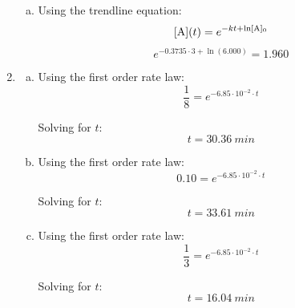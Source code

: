 \documentclass{article}
\begin{document}
\begin{enumerate}[1.]
\begin{enumerate}[a.]
            \item Using the trendline equation:
                $$ [ \ce{ A } ](t) = e^{-kt + \ln [ \ce{ A } ]_{0}} $$
                $$ e^{-0.3735 \cdot 3 + \ln( 6.000 )} = 1.960 $$

        \end{enumerate}
    \item 
        \begin{enumerate}[a.]
            \item Using the first order rate law:
                $$ \frac{ 1 }{ 8 } = e^{-6.85 \cdot 10^{-2} \cdot t} $$

                Solving for $t$:
                $$ t = 30.36\ \si{ min } $$

            \item Using the first order rate law:
                $$ 0.10 = e^{-6.85 \cdot 10^{-2} \cdot t} $$

                Solving for $t$:
                $$ t = 33.61\ \si{ min } $$

            \item Using the first order rate law:
                $$ \frac{ 1 }{ 3 } = e^{-6.85 \cdot 10^{-2} \cdot t} $$

                Solving for $t$:
                $$ t = 16.04\ \si{ min } $$

        \end{enumerate}
\end{enumerate}
\end{document}
